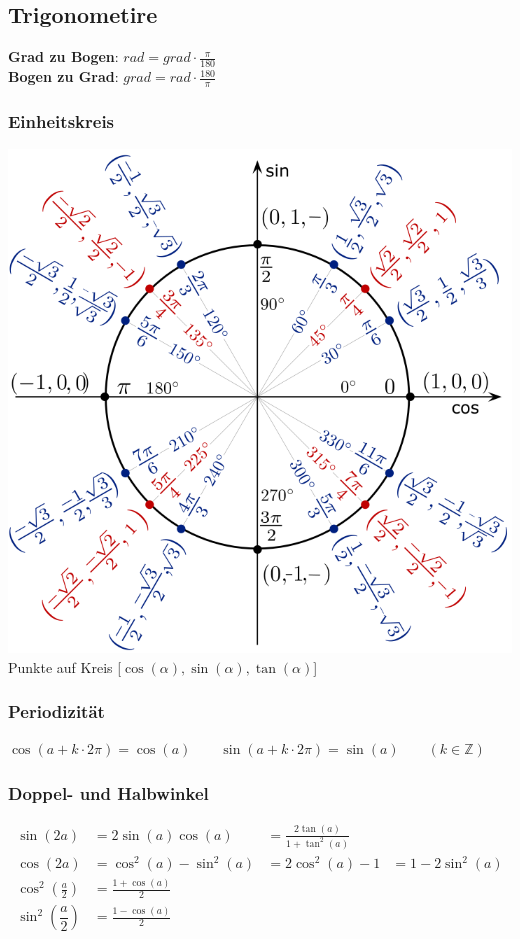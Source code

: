 \subsection{Trigonometire}
\noindent\textbf{Grad zu Bogen}: $ rad = grad \cdot \frac{\pi}{180} $~\\
\noindent\textbf{Bogen zu Grad}: $ grad = rad \cdot \frac{180}{\pi}$
\subsubsection{Einheitskreis}
\begin{center}
	\includegraphics[width=0.75\columnwidth]{Images/einheitskreis}\\
	Punkte auf Kreis [$\cos(\alpha), \sin(\alpha), \tan(\alpha)$]
\end{center}

\subsubsection{Periodizität}
$\cos(a+k\cdot2\pi)=\cos(a) \qquad \sin(a+k\cdot2\pi)=\sin(a) \qquad
(k \in \mathbb{Z})$

\subsubsection{Doppel- und Halbwinkel}	
\begin{align*}
	\sin(2a) &=2\sin(a)\cos(a) &= \frac{2\tan(a)}{1 +\tan^2(a)}\\
	\cos(2a) &=\cos^2(a)-\sin^2(a) &= 2\cos^2(a)-1 &= 1-2\sin^2(a)\\
	\cos^2 \left(\frac{a}{2}\right) &=\frac{1+\cos(a)}{2} \\
	\sin^2 \left(\dfrac{a}{2}\right)&=\frac{1-\cos(a)}{2}
\end{align*}


